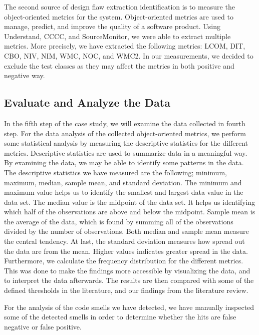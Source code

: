 The second source of design flaw extraction identification is to measure the object-oriented metrics for the system. Object-oriented metrics are used to manage, predict, and improve the quality of a software product\cite{rodriguez2001overview}. Using Understand, CCCC, and SourceMonitor, we were able to extract multiple metrics. More precisely, we have extracted the following metrics: LCOM, DIT, CBO, NIV, NIM, WMC, NOC, and WMC2. In our measurements, we decided to exclude the test classes as they may affect the metrics in both positive and negative way.




\subsection{Evaluate and Analyze the Data}
In the fifth step of the case study, we will examine the data collected in fourth step. For the data analysis of the collected object-oriented metrics, we perform some statistical analysis by measuring the descriptive statistics for the different metrics. Descriptive statistics are used to summarize data in a meaningful way. By examining the data, we may be able to identify some patterns in the data. The descriptive statistics we have measured are the following; minimum, maximum, median, sample mean, and standard deviation. The minimum and maximum value helps us to identify the smallest and largest data value in the data set. The median value is the midpoint of the data set. It helps us identifying which half of the observations are above and below the midpoint. Sample mean is the average of the data, which is found by summing all of the observations divided by the number of observations. Both median and sample mean measure the central tendency. At last, the standard deviation measures how spread out the data are from the mean. Higher values indicates greater spread in the data. Furthermore, we calculate the frequency distribution for the different metrics. This was done to make the findings more accessible by visualizing the data, and to interpret the data afterwards. The results are then compared with some of the defined thresholds in the literature, and our findings from the literature review. 

For the analysis of the code smells we have detected, we have manually inspected some of the detected smells in order to determine whether the hits are false negative or false positive. 



